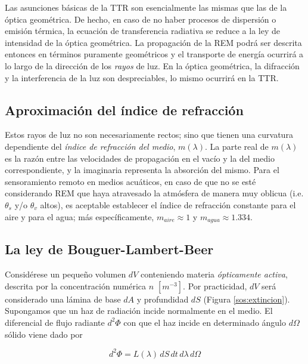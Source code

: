         Las asunciones básicas de la TTR son esencialmente las mismas que las de la óptica geométrica. De hecho, en caso de no haber procesos de dispersión o emisión térmica, la ecuación de transferencia radiativa se reduce a la ley de intensidad de la óptica geométrica. La propagación de la REM podrá ser descrita entonces en términos puramente geométricos y el transporte de energía ocurrirá a lo largo de la dirección de los \textit{rayos} de luz. En la óptica geométrica, la difracción y la interferencia de la luz son despreciables, lo mismo ocurrirá en la TTR.
    
    \subsection{Aproximación del índice de refracción}
    \label{sos:s:aproxindrefrac}

        Estos rayos de luz no son necesariamente rectos; sino que tienen una curvatura dependiente del \textit{índice de refracción del medio}, $m(\lambda)$. La parte real de $m(\lambda)$ es la razón entre las velocidades de propagación en el vacío y la del medio correspondiente, y la imaginaria representa la absorción del mismo. Para el sensoramiento remoto en medios acuáticos, en caso de que no se esté considerando REM que haya atravesado la atmósfera de manera muy oblicua (i.e. $\theta_{s}$ y/o $\theta_{v}$ altos), es aceptable establecer el índice de refracción constante para el aire y para el agua; más específicamente, $m_{aire}\approx 1$ y $m_{agua}\approx 1.334$.
    
    \subsection{La ley de Bouguer-Lambert-Beer}
    \label{sos:s:bouguerlambertbeer}

        Considérese un pequeño volumen $dV$ conteniendo materia \textit{ópticamente activa}, descrita por la concentración numérica $n$ $[m^{-3}]$. Por practicidad, $dV$ será considerado una lámina de base $dA$ y profundidad $dS$ (Figura \ref{sos:extincion}). Supongamos que un haz de radiación incide normalmente en el medio. El diferencial de flujo radiante $d^{2}\Phi$ con que el haz incide en determinado ángulo $d\Omega$ sólido viene dado por
    
        \begin{equation}
        d^{2}\Phi=L(\lambda)\,dS\,dt\,d\lambda \,d\Omega
        \label{sos:eq:laambertdif1}
        \end{equation}
        

